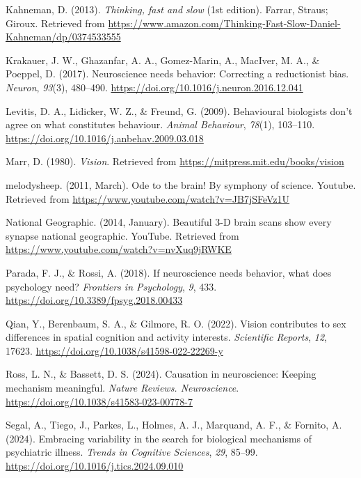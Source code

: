\documentclass[
  letterpaper,
  DIV=11,
  numbers=noendperiod]{scrartcl}
\newlength{\cslhangindent}
\newenvironment{CSLReferences}[2] %
 {\begin{list}{}{%
  \setlength{\itemindent}{0pt}
  \setlength{\leftmargin}{0pt}
  \setlength{\parsep}{0pt}
  \ifodd #1
   \setlength{\leftmargin}{\cslhangindent}
   \setlength{\itemindent}{-1\cslhangindent}
  \fi
  \setlength{\itemsep}{#2\baselineskip}}}
 {\end{list}}
\begin{document}
\begin{CSLReferences}{1}{0}
Kahneman, D. (2013). \emph{Thinking, fast and slow} (1st edition).
Farrar, Straus; Giroux. Retrieved from
\url{https://www.amazon.com/Thinking-Fast-Slow-Daniel-Kahneman/dp/0374533555}

Krakauer, J. W., Ghazanfar, A. A., Gomez-Marin, A., MacIver, M. A., \&
Poeppel, D. (2017). Neuroscience needs behavior: Correcting a
reductionist bias. \emph{Neuron}, \emph{93}(3), 480--490.
\url{https://doi.org/10.1016/j.neuron.2016.12.041}

Levitis, D. A., Lidicker, W. Z., \& Freund, G. (2009). Behavioural
biologists don't agree on what constitutes behaviour. \emph{Animal
Behaviour}, \emph{78}(1), 103--110.
\url{https://doi.org/10.1016/j.anbehav.2009.03.018}

Marr, D. (1980). \emph{Vision}. Retrieved from
\url{https://mitpress.mit.edu/books/vision}

melodysheep. (2011, March). Ode to the brain! By symphony of science.
Youtube. Retrieved from
\url{https://www.youtube.com/watch?v=JB7jSFeVz1U}

National Geographic. (2014, January). Beautiful {3-D} brain scans show
every synapse \textbar{} national geographic. You{T}ube. Retrieved from
\url{https://www.youtube.com/watch?v=nvXuq9jRWKE}

Parada, F. J., \& Rossi, A. (2018). If neuroscience needs behavior, what
does psychology need? \emph{Frontiers in Psychology}, \emph{9}, 433.
\url{https://doi.org/10.3389/fpsyg.2018.00433}

Qian, Y., Berenbaum, S. A., \& Gilmore, R. O. (2022). Vision contributes
to sex differences in spatial cognition and activity interests.
\emph{Scientific Reports}, \emph{12}, 17623.
\url{https://doi.org/10.1038/s41598-022-22269-y}

Ross, L. N., \& Bassett, D. S. (2024). Causation in neuroscience:
Keeping mechanism meaningful. \emph{Nature Reviews. Neuroscience}.
\url{https://doi.org/10.1038/s41583-023-00778-7}

Segal, A., Tiego, J., Parkes, L., Holmes, A. J., Marquand, A. F., \&
Fornito, A. (2024). Embracing variability in the search for biological
mechanisms of psychiatric illness. \emph{Trends in Cognitive Sciences},
\emph{29}, 85--99. \url{https://doi.org/10.1016/j.tics.2024.09.010}


\end{CSLReferences}
\end{document}
